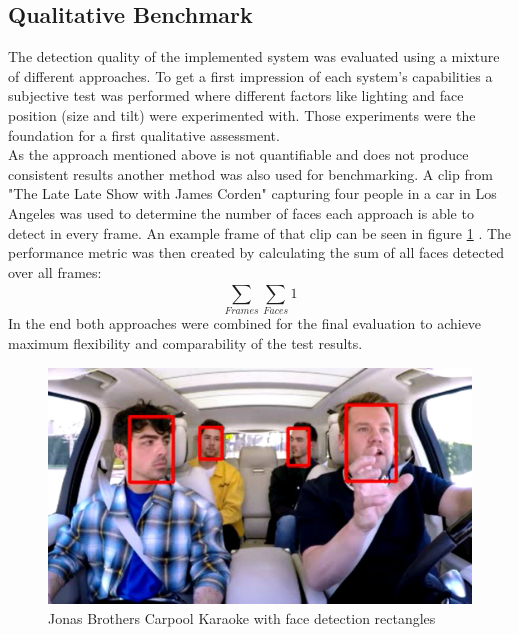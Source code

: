 \subsection{Qualitative Benchmark}
The detection quality of the implemented system was evaluated using a mixture of different approaches. To get a first impression of each system's capabilities a subjective test was performed where different factors like lighting and face position (size and tilt) were experimented with. Those experiments were the foundation for a first qualitative assessment.\\
As the approach mentioned above is not quantifiable and does not produce consistent results another method was also used for benchmarking. A clip from "The Late Late Show with James Corden" \cite{latenight} capturing four people in a car in Los Angeles was used to determine the number of faces each approach is able to detect in every frame. An example frame of that clip can be seen in figure \ref{fig:latenight} \cite{jonasbrothers}. The performance metric was then created by calculating the sum of all faces detected over all frames: 
\[
\sum_{Frames}^{} 
\sum_{Faces}^{} 1
\]
In the end both approaches were combined for the final evaluation to achieve maximum flexibility and comparability of the test results.
\begin{figure}[H]
  \centering
  \includegraphics[width=0.8\columnwidth]{media/media_combo.jpg}
  \caption{Jonas Brothers Carpool Karaoke with face detection rectangles}
  \label{fig:latenight}
\end{figure}
\newpage
